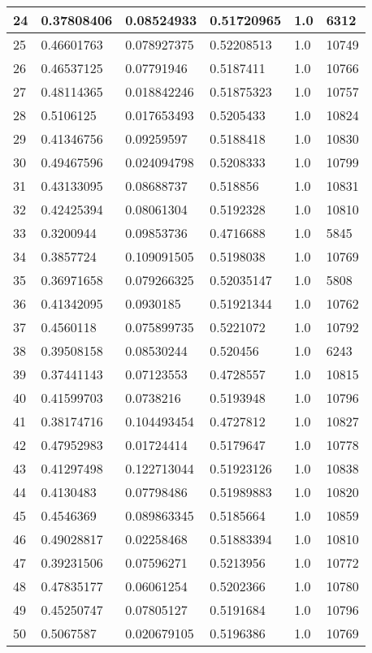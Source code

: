 \begin{longtable}{|l|l|l|l|l|l|}
24 & 0.37808406 & 0.08524933 & 0.51720965 & 1.0 & 6312 \\ \hline 
25 & 0.46601763 & 0.078927375 & 0.52208513 & 1.0 & 10749 \\ \hline 
26 & 0.46537125 & 0.07791946 & 0.5187411 & 1.0 & 10766 \\ \hline 
27 & 0.48114365 & 0.018842246 & 0.51875323 & 1.0 & 10757 \\ \hline 
28 & 0.5106125 & 0.017653493 & 0.5205433 & 1.0 & 10824 \\ \hline 
29 & 0.41346756 & 0.09259597 & 0.5188418 & 1.0 & 10830 \\ \hline 
30 & 0.49467596 & 0.024094798 & 0.5208333 & 1.0 & 10799 \\ \hline 
31 & 0.43133095 & 0.08688737 & 0.518856 & 1.0 & 10831 \\ \hline 
32 & 0.42425394 & 0.08061304 & 0.5192328 & 1.0 & 10810 \\ \hline 
33 & 0.3200944 & 0.09853736 & 0.4716688 & 1.0 & 5845 \\ \hline 
34 & 0.3857724 & 0.109091505 & 0.5198038 & 1.0 & 10769 \\ \hline 
35 & 0.36971658 & 0.079266325 & 0.52035147 & 1.0 & 5808 \\ \hline 
36 & 0.41342095 & 0.0930185 & 0.51921344 & 1.0 & 10762 \\ \hline 
37 & 0.4560118 & 0.075899735 & 0.5221072 & 1.0 & 10792 \\ \hline 
38 & 0.39508158 & 0.08530244 & 0.520456 & 1.0 & 6243 \\ \hline 
39 & 0.37441143 & 0.07123553 & 0.4728557 & 1.0 & 10815 \\ \hline 
40 & 0.41599703 & 0.0738216 & 0.5193948 & 1.0 & 10796 \\ \hline 
41 & 0.38174716 & 0.104493454 & 0.4727812 & 1.0 & 10827 \\ \hline 
42 & 0.47952983 & 0.01724414 & 0.5179647 & 1.0 & 10778 \\ \hline 
43 & 0.41297498 & 0.122713044 & 0.51923126 & 1.0 & 10838 \\ \hline 
44 & 0.4130483 & 0.07798486 & 0.51989883 & 1.0 & 10820 \\ \hline 
45 & 0.4546369 & 0.089863345 & 0.5185664 & 1.0 & 10859 \\ \hline 
46 & 0.49028817 & 0.02258468 & 0.51883394 & 1.0 & 10810 \\ \hline 
47 & 0.39231506 & 0.07596271 & 0.5213956 & 1.0 & 10772 \\ \hline 
48 & 0.47835177 & 0.06061254 & 0.5202366 & 1.0 & 10780 \\ \hline 
49 & 0.45250747 & 0.07805127 & 0.5191684 & 1.0 & 10796 \\ \hline 
50 & 0.5067587 & 0.020679105 & 0.5196386 & 1.0 & 10769 \\ \hline 
\end{longtable}